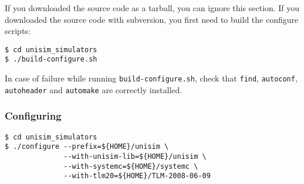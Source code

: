 If you downloaded the source code as a tarball, you can ignore this section. If you downloaded the source code with subversion, you first need to build the configure scripts:

\begin{verbatim}
$ cd unisim_simulators
$ ./build-configure.sh
\end{verbatim}

In case of failure while running \texttt{build-configure.sh}, check that \texttt{find}, \texttt{autoconf}, \texttt{autoheader} and \texttt{automake} are correctly installed.

\subsubsection{Configuring}

\begin{verbatim}
$ cd unisim_simulators
$ ./configure --prefix=${HOME}/unisim \
              --with-unisim-lib=${HOME}/unisim \
              --with-systemc=${HOME}/systemc \
              --with-tlm20=${HOME}/TLM-2008-06-09
\end{verbatim}

